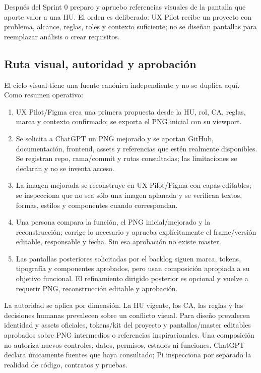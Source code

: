 \documentclass[11pt,a4paper]{article}
\begin{document}
Después del Sprint 0 preparo y apruebo referencias visuales de la pantalla que aporte valor a una HU. El orden es deliberado: UX Pilot recibe un proyecto con problema, alcance, reglas, roles y contexto suficiente; no se diseñan pantallas para reemplazar análisis o crear requisitos.

\subsection{Ruta visual, autoridad y aprobación}

El ciclo visual tiene una fuente canónica independiente y no se duplica aquí. Como resumen operativo:

\begin{enumerate}
    \item UX Pilot/Figma crea una primera propuesta desde la HU, rol, CA, reglas, marca y contexto confirmado; se exporta el PNG inicial con su viewport.
    \item Se solicita a ChatGPT un PNG mejorado y se aportan GitHub, documentación, frontend, assets y referencias que estén realmente disponibles. Se registran repo, rama/commit y rutas consultadas; las limitaciones se declaran y no se inventa acceso.
    \item La imagen mejorada se reconstruye en UX Pilot/Figma con capas editables; se inspecciona que no sea sólo una imagen aplanada y se verifican textos, formas, estilos y componentes cuando correspondan.
    \item Una persona compara la función, el PNG inicial/mejorado y la reconstrucción; corrige lo necesario y aprueba explícitamente el frame/versión editable, responsable y fecha. Sin esa aprobación no existe master.
    \item Las pantallas posteriores solicitadas por el backlog siguen marca, tokens, tipografía y componentes aprobados, pero usan composición apropiada a su objetivo funcional. El refinamiento dirigido posterior es opcional y vuelve a requerir PNG, reconstrucción editable y aprobación.
\end{enumerate}

La autoridad se aplica por dimensión. La HU vigente, los CA, las reglas y las decisiones humanas prevalecen sobre un conflicto visual. Para diseño prevalecen identidad y assets oficiales, tokens/kit del proyecto y pantallas/master editables aprobados sobre PNG intermedios o referencias inspiracionales. Una composición no autoriza nuevos controles, datos, permisos, estados ni funciones. ChatGPT declara únicamente fuentes que haya consultado; Pi inspecciona por separado la realidad de código, contratos y pruebas.
\end{document}
